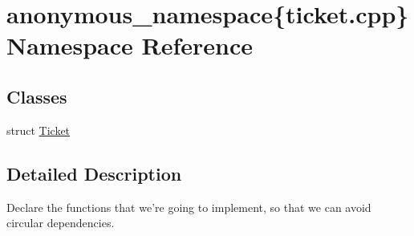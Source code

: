 \hypertarget{namespaceanonymous__namespace_02ticket_8cpp_03}{\section{anonymous\-\_\-namespace\{ticket.\-cpp\} Namespace Reference}
\label{namespaceanonymous__namespace_02ticket_8cpp_03}
}
\subsection*{Classes}
\begin{DoxyCompactItemize}
\item 
struct \hyperlink{structanonymous__namespace_02ticket_8cpp_03_1_1Ticket}{Ticket}
\end{DoxyCompactItemize}


\subsection{Detailed Description}
Declare the functions that we're going to implement, so that we can avoid circular dependencies. 